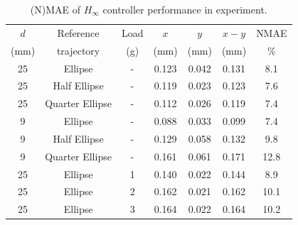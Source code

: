 \begin{table}[t]
\centering
\caption{(N)MAE of $H_{\infty}$ controller performance in experiment.}\vspace{-0.25cm}
\begin{tabular}{c c c c c c c}
\hline
\hspace{-2mm} $d$ & Reference & Load & $x$ & $y$ & $x-y$ & \hspace{-2mm} NMAE\\
\hspace{-2mm} (mm) &  trajectory   & (g)  & (mm)& (mm)& (mm) & \hspace{-2mm}$\%$\\
\hline
\hspace{-2mm}25 & Ellipse          & - & 0.123 & 0.042 & 0.131 & \hspace{-2mm}8.1\\
\hspace{-2mm}25 & Half Ellipse     & - & 0.119 & 0.023 & 0.123 & \hspace{-2mm}7.6\\
\hspace{-2mm}25 & Quarter Ellipse  & - & 0.112 & 0.026 & 0.119 & \hspace{-2mm}7.4\\
\hspace{-2mm}9 & Ellipse           & - & 0.088 & 0.033 & 0.099 & \hspace{-2mm}7.4\\
\hspace{-2mm}9 & Half Ellipse      & - & 0.129 & 0.058 & 0.132 & \hspace{-2mm}9.8\\
\hspace{-2mm}9 & Quarter Ellipse   & - & 0.161 & 0.061 & 0.171 & \hspace{-2mm}12.8\\
\hspace{-2mm}25 & Ellipse          & 1 & 0.140 & 0.022 & 0.144 & \hspace{-2mm}8.9\\
\hspace{-2mm}25 & Ellipse          & 2 & 0.162 & 0.021 & 0.162 & \hspace{-2mm}10.1\\
\hspace{-2mm}25 & Ellipse          & 3 & 0.164 & 0.022 & 0.164 & \hspace{-2mm}10.2\\ 
\hline
\end{tabular}
\label{table:control}
\vspace{-4mm}
\end{table}

